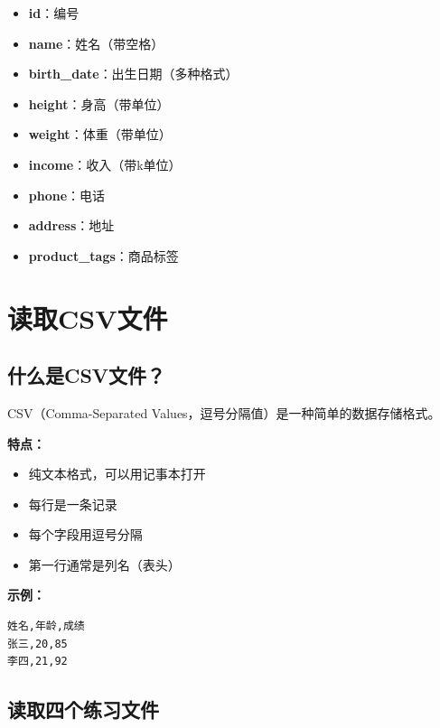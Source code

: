 \documentclass[12pt,a4paper]{article}
\begin{document}
\begin{knowledgebox}[数据字段说明]
\begin{itemize}
    \item \textbf{id}：编号
    \item \textbf{name}：姓名（带空格）
    \item \textbf{birth\_date}：出生日期（多种格式）
    \item \textbf{height}：身高（带单位）
    \item \textbf{weight}：体重（带单位）
    \item \textbf{income}：收入（带k单位）
    \item \textbf{phone}：电话
    \item \textbf{address}：地址
    \item \textbf{product\_tags}：商品标签
\end{itemize}
\end{knowledgebox}

\section{读取CSV文件}

\subsection{什么是CSV文件？}

\begin{knowledgebox}[CSV文件介绍]
CSV（Comma-Separated Values，逗号分隔值）是一种简单的数据存储格式。

\textbf{特点：}
\begin{itemize}
    \item 纯文本格式，可以用记事本打开
    \item 每行是一条记录
    \item 每个字段用逗号分隔
    \item 第一行通常是列名（表头）
\end{itemize}

\textbf{示例：}
\begin{verbatim}
姓名,年龄,成绩
张三,20,85
李四,21,92
\end{verbatim}
\end{knowledgebox}

\subsection{读取四个练习文件}
\end{document}
